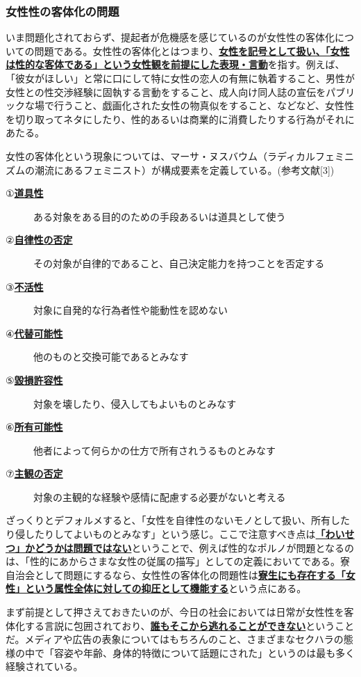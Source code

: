 \subsubsection{\large 女性性の客体化の問題}
いま問題化されておらず、提起者が危機感を感じているのが女性性の客体化についての問題である。女性性の客体化とはつまり、\uline{\bf{女性を記号として扱い、「女性は性的な客体である」という女性観を前提にした表現・言動}}を指す。例えば、「彼女がほしい」と常に口にして特に女性の恋人の有無に執着すること、男性が女性との性交渉経験に固執する言動をすること、成人向け同人誌の宣伝をパブリックな場で行うこと、戯画化された女性の物真似をすること、などなど、女性性を切り取ってネタにしたり、性的あるいは商業的に消費したりする行為がそれにあたる。
\par 女性の客体化という現象については、マーサ・ヌスバウム（ラディカルフェミニズムの潮流にあるフェミニスト）が構成要素を定義している。(参考文献[3])
\begin{description}
\item[①\uline{\bf{道具性}}]ある対象をある目的のための手段あるいは道具として使う
\item[②\uline{\bf{自律性の否定}}]その対象が自律的であること、自己決定能力を持つことを否定する
\item[③\uline{\bf{不活性}}]対象に自発的な行為者性や能動性を認めない
\item[④\uline{\bf{代替可能性}}]他のものと交換可能であるとみなす
\item[⑤\uline{\bf{毀損許容性}}]対象を壊したり、侵入してもよいものとみなす
\item[⑥\uline{\bf{所有可能性}}]他者によって何らかの仕方で所有されうるものとみなす
\item[⑦\uline{\bf{主観の否定}}]対象の主観的な経験や感情に配慮する必要がないと考える
\end{description}
\par ざっくりとデフォルメすると、「女性を自律性のないモノとして扱い、所有したり侵したりしてよいものとみなす」という感じ。ここで注意すべき点は\uline{\bf{「わいせつ」かどうかは問題ではない}}ということで、例えば性的なポルノが問題となるのは、「性的にあからさまな女性の従属の描写」としての定義においてである。寮自治会として問題にするなら、女性性の客体化の問題性は\uline{\bf{寮生にも存在する「女性」という属性全体に対しての抑圧として機能する}}という点にある。
\par まず前提として押さえておきたいのが、今日の社会においては日常が女性性を客体化する言説に包囲されており、\uline{\bf{誰もそこから逃れることができない}}ということだ。メディアや広告の表象についてはもちろんのこと、さまざまなセクハラの態様の中で「容姿や年齢、身体的特徴について話題にされた」というのは最も多く経験されている。
